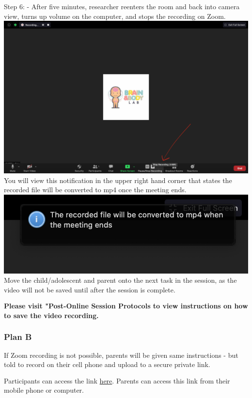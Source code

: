 \documentclass[]{book}
\begin{document}
Step 6:
- After five minutes, researcher reenters the room and back into camera view, turns up volume on the computer, and stops the recording on Zoom. \includegraphics{images/zoom_parent_child_interaction/5.png} You will view this notification in the upper right hand corner that states the recorded file will be converted to mp4 once the meeting ends. \includegraphics{images/zoom_parent_child_interaction/6.png} Move the child/adolescent and parent onto the next task in the session, as the video will not be saved until after the session is complete.

\textbf{Please visit "Post-Online Session Protocols to view instructions on how to save the video recording.}

\hypertarget{plan-b}{%
\subsubsection{Plan B}\label{plan-b}}

If Zoom recording is not possible, parents will be given same instructions - but told to record on their cell phone and upload to a secure private link.

Participants can access the link \href{https://ucla.app.box.com/f/3c52df2afb1a446ab363b793f8af22c1}{here}. Parents can access this link from their mobile phone or computer.
\end{document}

